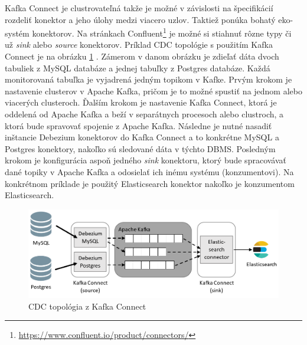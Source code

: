 Kafka Connect je clustrovateľná takže je možné v závislosti na špecifikácií rozdeliť konektor a jeho úlohy medzi viacero uzlov. Taktiež ponúka bohatý eko-systém konektorov. Na stránkach Confluent\footnote{\url{https://www.confluent.io/product/connectors/}} je možné si stiahnuť rôzne typy či už \textit{sink} alebo \textit{source} konektorov.
Príklad CDC topológie s použitím Kafka Connect je na obrázku \ref{fig:CDC_topology} \cite{debezium:devoxx}. Zámerom v danom obrázku je zdieľať dáta dvoch tabuliek z MySQL databáze a jednej tabuľky z Postgres databáze. Každá monitorovaná tabuľka je vyjadrená jedným topikom v Kafke. Prvým krokom je nastavenie clusterov v Apache Kafka, pričom je to možné spustiť na jednom alebo viacerých clusteroch. Ďalším krokom je nastavenie Kafka Connect, ktorá je oddelená od Apache Kafka a beží v separátnych procesoch alebo clustroch, a ktorá bude spravovať spojenie z Apache Kafka. Následne je nutné nasadiť inštancie Debezium konektorov do Kafka Connect a to konkrétne MySQL a Postgres konektory, nakoľko sú sledované dáta v týchto DBMS. Posledným krokom je konfigurácia aspoň jedného \textit{sink} konektoru, ktorý bude spracovávať dané topiky v Apache Kafka a odosielať ich inému systému (konzumentovi). Na konkrétnom príklade je použitý Elasticsearch konektor nakoľko je konzumentom Elasticsearch.

\begin{figure}[H]
\begin{center}
\includegraphics[width=15cm]{figures/CDC_topology.PNG}
\caption{CDC topológia z Kafka Connect}
\label{fig:CDC_topology}
\end{center}
\end{figure}

